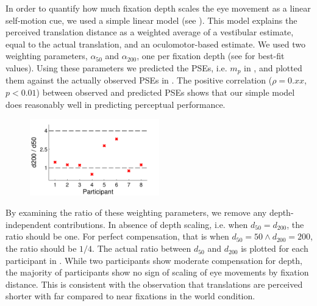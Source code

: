 In order to quantify how much fixation depth scales the eye movement as a linear self-motion cue, we used a simple linear model (see ). This model explains the perceived translation distance as a weighted average of a vestibular estimate, equal to the actual translation, and an oculomotor-based estimate. 
We used two weighting parameters, $\alpha_{50}$ and $\alpha_{200}$, one per fixation depth (see  for best-fit values). Using these parameters we predicted the PSEs, i.e. $m_p$ in , and plotted them against the actually observed PSEs in . The positive correlation ($\rho = 0.xx$, $p < 0.01$) between observed and predicted PSEs shows that our simple model does reasonably well in predicting perceptual performance.

\begin{figure}
    \includegraphics[width=0.5\textwidth]{src/paper4/p4_figure5.pdf}

	\caption{}
	\label{p4:fig5}
\end{figure}

By examining the ratio of these weighting parameters, we remove any depth-independent contributions. In absence of  depth scaling, i.e. when $d_{50} = d_{200}$, the ratio should be one. For perfect compensation, that is when $d_{50} = 50  \wedge d_{200} = 200$, the ratio should be $1/4$. The actual ratio between $d_{50}$ and $d_{200}$ is plotted for each participant in . While two participants show moderate compensation for depth, the majority of participants show no sign of scaling of eye movements by fixation distance. This is consistent with the observation that translations are perceived shorter with far compared to near fixations in the world condition.
